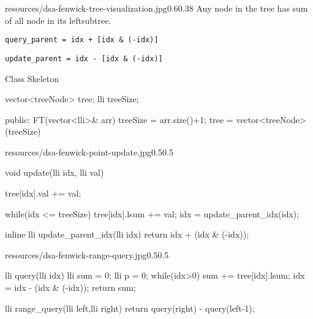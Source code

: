 \begin{lfigure}{resources/dsa-fenwick-tree-visualization.jpg}{0.6}{0.38}
    Any node in the tree has sum of all node in its leftsubtree.
    \vspace{1cm}

    \verb|query_parent = idx + [idx & (-idx)]|

    \verb|update_parent = idx - [idx & (-idx)]|

    \vspace{2cm}
    Class Skeleton
    \begin{code3}

    vector<treeNode> tree;
    lli treeSize;

    public:
    FT(vector<lli>& arr)
    {
        treeSize = arr.size()+1;
        tree = 
        vector<treeNode>(treeSize)
    }
    \end{code3}

\end{lfigure}

\begin{lfigure}{resources/dsa-fenwick-point-update.jpg}{0.5}{0.5}

    \begin{code3}
    void update(lli idx, lli val)
    {
        tree[idx].val += val;

        while(idx <= treeSize)
        {
            tree[idx].lsum += val;
            idx = update_parent_idx(idx);
        }
    }

  
    inline lli update_parent_idx(lli idx)
    {
        return  idx + (idx & (-idx));
    }
    \end{code3}

\end{lfigure}

\begin{lfigure}{resources/dsa-fenwick-range-query.jpg}{0.5}{0.5}
    \begin{code3}
    lli query(lli idx)
    {
        lli sum = 0;
        lli p = 0;
        while(idx>0)
        {
            sum += tree[idx].lsum;
            idx = idx - (idx & (-idx));        
        } 
        return sum;
    }
    
    lli range_query(lli left,lli right)
    {
        return query(right) - query(left-1);
    }
    \end{code3}
\end{lfigure}